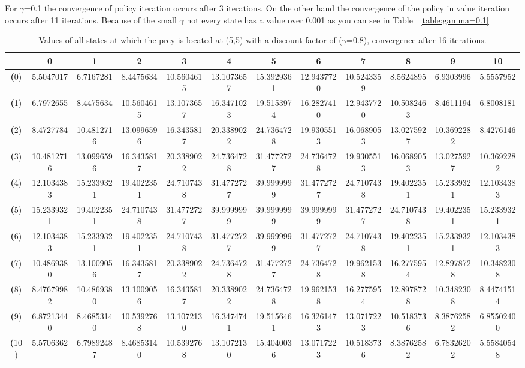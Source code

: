\documentclass[11pt]{article}
\begin{document}
For $\gamma$=0.1 the convergence of policy iteration occurs after 3 iterations. On the other hand the convergence of the policy in value iteration occurs after 11 iterations. Because of the small $\gamma$ not every state has a value over 0.001 as you can see in Table ~\ref{table:gamma=0.1} 

\begin{center}
\begin{table}[ht]
{\small
\hfill{}
\begin{tabular}{c|c|c|c|c|c|c|c|c|c|c|c}
\textbf{} & \textbf{0} & \textbf{1} & \textbf{2} & \textbf{3} & \textbf{4} & \textbf{5} & \textbf{6} & \textbf{7} & \textbf{8} & \textbf{9} & \textbf{10}\\
	\hline
\textbf(0) & 5.5047017 & 6.7167281 &
8.4475634 & 10.5604615 & 13.1073657 & 15.3929361 & 12.9437720 & 10.5243359 & 8.5624895 & 6.9303996 & 5.5557952\\
\textbf(1) & 6.7972655 & 8.4475634 & 10.5604615 & 13.1073657 & 16.3471023 & 19.5153974 & 16.2827410 & 12.9437720 & 10.5082463 & 8.4611194 & 6.8008181\\
\textbf(2) & 8.4727784 & 10.4812716 & 13.0996596 & 16.3435817 & 20.3389022 & 24.7364728 & 19.9305513 & 16.0689053 & 13.0275927 & 10.3692282 & 8.4276146\\
\textbf(3) & 10.4812716 & 13.0996596 & 16.3435817 & 20.3389022 & 24.7364728 & 31.4772727 & 24.7364728 & 19.9305513 & 16.0689053 & 13.0275927 & 10.3692282\\
\textbf(4) & 12.1034383 & 15.2339321 & 19.4022351 & 24.7107438 & 31.4772727 & 39.9999999 & 31.4772727 & 24.7107438 & 19.4022351 & 15.2339321 & 12.1034383\\
\textbf(5) & 15.2339321 & 19.4022351 & 24.7107438 & 31.4772727 & 39.9999999 & 39.9999999 & 39.9999999 & 31.4772727 & 24.7107438 & 19.4022351 & 15.2339321\\
\textbf(6) & 12.1034383 & 15.2339321 & 19.4022351 & 24.7107438 & 31.4772727 & 39.9999999 & 31.4772727 & 24.7107438 & 19.4022351 & 15.2339321 & 12.1034383\\
\textbf(7) & 10.4869380 & 13.1009056 & 16.3435817 & 20.3389022 & 24.7364728 & 31.4772727 & 24.7364728 & 19.9621538 & 16.2775954 & 12.8978728 & 10.3482308\\
\textbf(8) & 8.47679982 & 10.4869380 & 13.1009056 & 16.3435817 & 20.3389022 & 24.7364728 & 19.9621538 & 16.2775954 & 12.8978728 & 10.3482308 & 8.44741514\\
\textbf(9) & 6.87213440 & 8.46853140 & 10.5392768 & 13.1072130 & 16.3474741 & 19.5156461 & 16.3261473 & 13.0717223 & 10.5183736 & 8.38762582 & 6.85502400\\
\textbf(10) & 5.5706362 & 6.79892487 & 8.46853140 & 10.5392768 & 13.1072130 & 15.4040036 & 13.0717223 & 10.5183736 & 8.38762582 & 6.78326202 & 5.55840548\\
\end{tabular}}
\hfill{}
\caption{Values of all states at which the prey is located at (5,5) with a discount factor of ($\gamma$=0.8), convergence after 16 iterations.}
\label{table:gamma=0.8}
\end{table}
\end{center}
\end{document}
